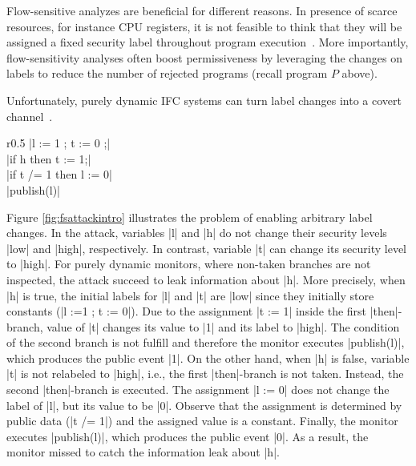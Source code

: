 
Flow-sensitive analyzes are beneficial for different reasons. In presence of
scarce resources, for instance CPU registers, it is not feasible to think that
they will be assigned a fixed security label throughout program
execution~\citep{BonelliCM05}. More importantly, flow-sensitivity analyses often
boost permissiveness by leveraging the changes on labels to reduce the number of
rejected programs (recall program $P$ above). 


Unfortunately, purely dynamic IFC
systems can turn label changes into a covert channel~\citep{Russo:2010}. 
\begin{wrapfigure}{r}{0.5\columnwidth}
|l := 1 ; t := 0 ;| \\
|if h then t := 1;| \\
|if t /= 1 then l := 0| \\
|publish(l)| 
\caption{\small\label{fig:fsattackintro} Flow-sensitive attack}
\end{wrapfigure}
Figure \ref{fig:fsattackintro} illustrates the problem of enabling arbitrary
label changes.  In the attack, variables |l| and |h| do not change their
security levels |low| and |high|, respectively. In contrast, variable |t| can
change its security level to |high|. For purely dynamic monitors, where
non-taken branches are not inspected, the attack succeed to leak information
about |h|. More precisely, when |h| is true, the initial labels for |l| and |t|
are |low| since they initially store constants (|l :=1 ; t := 0|).  Due to 
the assignment |t := 1| inside the
first |then|-branch, value of |t| changes its value to |1| and its label to
|high|. The condition of the second branch is not fulfill and therefore 
the monitor executes |publish(l)|, which produces the public event 
|1|. On the other hand, when |h| is false, variable |t| is not relabeled to 
|high|, i.e., the first |then|-branch is not taken. Instead, the second
|then|-branch is executed. 
The assignment |l := 0| does not change the label of |l|, but its value to 
be |0|. Observe that the assignment is determined by public data (|t /= 1|)
and the assigned value is a constant. Finally, the monitor executes
|publish(l)|, which produces the public event |0|. As a result, the monitor 
missed to catch the information leak about |h|.  

